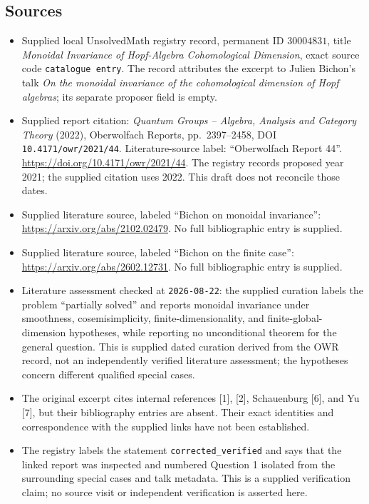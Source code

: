 \documentclass[11pt]{article}
\begin{document}
\subsection{Sources}
\begin{itemize}
\item Supplied local UnsolvedMath registry record, permanent ID \(30004831\), title \emph{Monoidal Invariance of Hopf-Algebra Cohomological Dimension}, exact source code \texttt{catalogue entry}. The record attributes the excerpt to Julien Bichon's talk \emph{On the monoidal invariance of the cohomological dimension of Hopf algebras}; its separate proposer field is empty.
\item Supplied report citation: \emph{Quantum Groups -- Algebra, Analysis and Category Theory} (2022), Oberwolfach Reports, pp.\ 2397--2458, DOI \texttt{10.4171/owr/2021/44}. Literature-source label: ``Oberwolfach Report 44''. \url{https://doi.org/10.4171/owr/2021/44}. The registry records proposed year 2021; the supplied citation uses 2022. This draft does not reconcile those dates.
\item Supplied literature source, labeled ``Bichon on monoidal invariance'': \url{https://arxiv.org/abs/2102.02479}. No full bibliographic entry is supplied.
\item Supplied literature source, labeled ``Bichon on the finite case'': \url{https://arxiv.org/abs/2602.12731}. No full bibliographic entry is supplied.
\item Literature assessment checked at \texttt{2026-08-22}: the supplied curation labels the problem ``partially solved'' and reports monoidal invariance under smoothness, cosemisimplicity, finite-dimensionality, and finite-global-dimension hypotheses, while reporting no unconditional theorem for the general question. This is supplied dated curation derived from the OWR record, not an independently verified literature assessment; the hypotheses concern different qualified special cases.
\item The original excerpt cites internal references [1], [2], Schauenburg [6], and Yu [7], but their bibliography entries are absent. Their exact identities and correspondence with the supplied links have not been established.
\item The registry labels the statement \texttt{corrected\_verified} and says that the linked report was inspected and numbered Question 1 isolated from the surrounding special cases and talk metadata. This is a supplied verification claim; no source visit or independent verification is asserted here.
\end{itemize}
\end{document}
